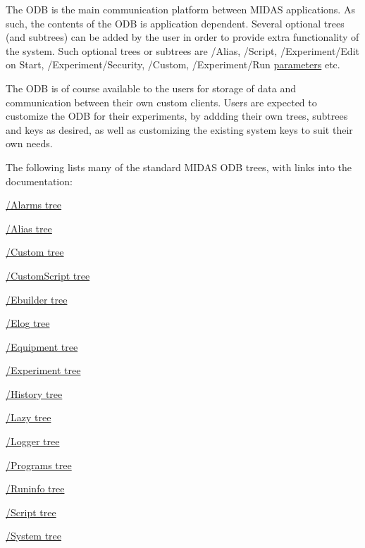 The ODB is the main communication platform between MIDAS applications. As such, the contents of the ODB is application dependent. Several optional trees (and subtrees) can be added by the user in order to provide extra functionality of the system. Such optional trees or subtrees are /Alias, /Script, /Experiment/Edit on Start, /Experiment/Security, /Custom, /Experiment/Run \hyperlink{structparameters}{parameters} etc.

The ODB is of course available to the users for storage of data and communication between their own custom clients. Users are expected to customize the ODB for their experiments, by addding their own trees, subtrees and keys as desired, as well as customizing the existing system keys to suit their own needs.

\label{F_ODB_Structure_idx_ODB_tree-list-of-MIDAS}
\hypertarget{F_ODB_Structure_idx_ODB_tree-list-of-MIDAS}{}


The following lists many of the standard MIDAS ODB trees, with links into the documentation:


\begin{DoxyItemize}
\item \hyperlink{RC_customize_ODB_RC_ODB_Alarms_Tree}{/Alarms tree}
\item \hyperlink{RC_mhttpd_Alias_page_RC_odb_alias_tree}{/Alias tree}
\item \hyperlink{RC_mhttpd_Activate_RC_odb_custom_tree}{/Custom tree}
\item \hyperlink{RC_mhttpd_custom_features_RC_odb_customscript_tree}{/CustomScript tree}
\item \hyperlink{FE_Event_Builder_FE_ODB_EBuilder_Tree}{/Ebuilder tree}
\item \hyperlink{F_Elog_F_ODB_Elog_Tree}{/Elog tree}
\item \hyperlink{FE_ODB_equipment_tree}{/Equipment tree}
\item \hyperlink{RC_customize_ODB_RC_ODB_Experiment_Tree}{/Experiment tree}
\item \hyperlink{F_History_logging_F_ODB_History_tree}{/History tree}
\item \hyperlink{F_LogUtil_F_ODB_Lazy_Tree}{/Lazy tree}
\item \hyperlink{F_Logging_Data_F_Logger_tree}{/Logger tree}
\item \hyperlink{RC_customize_ODB_RC_ODB_Programs_Tree}{/Programs tree}
\item \hyperlink{RC_Run_States_and_Transitions_RC_ODB_RunInfo_Tree}{/Runinfo tree}
\item \hyperlink{RC_mhttpd_defining_script_buttons_RC_odb_script_tree}{/Script tree}
\item \hyperlink{RC_Run_States_and_Transitions_RC_odb_system_tree}{/System tree}
\end{DoxyItemize}

